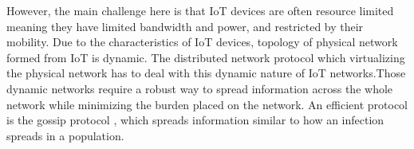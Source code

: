 \documentclass[12pt,journal]{IEEEtran}
\begin{document}
However, the main challenge here is that IoT devices are often resource limited meaning they have limited bandwidth and power, and restricted by their mobility. Due to the characteristics of IoT devices, topology of physical network formed from IoT is dynamic. The distributed network protocol which virtualizing the physical network has to deal with this dynamic nature of IoT networks.Those dynamic networks require a robust way to spread information across the whole network while minimizing the burden placed on the network. An efficient protocol is the gossip protocol \cite{gossip}, which spreads information similar to how an infection spreads in a population.






%
%
\end{document}
